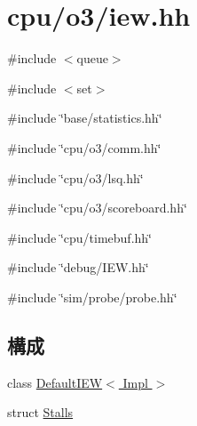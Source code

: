 \hypertarget{iew_8hh}{
\section{cpu/o3/iew.hh}
\label{iew_8hh}
}
{\ttfamily \#include $<$queue$>$}\par
{\ttfamily \#include $<$set$>$}\par
{\ttfamily \#include \char`\"{}base/statistics.hh\char`\"{}}\par
{\ttfamily \#include \char`\"{}cpu/o3/comm.hh\char`\"{}}\par
{\ttfamily \#include \char`\"{}cpu/o3/lsq.hh\char`\"{}}\par
{\ttfamily \#include \char`\"{}cpu/o3/scoreboard.hh\char`\"{}}\par
{\ttfamily \#include \char`\"{}cpu/timebuf.hh\char`\"{}}\par
{\ttfamily \#include \char`\"{}debug/IEW.hh\char`\"{}}\par
{\ttfamily \#include \char`\"{}sim/probe/probe.hh\char`\"{}}\par
\subsection*{構成}
\begin{DoxyCompactItemize}
\item 
class \hyperlink{classDefaultIEW}{DefaultIEW$<$ Impl $>$}
\item 
struct \hyperlink{structDefaultIEW_1_1Stalls}{Stalls}
\end{DoxyCompactItemize}
